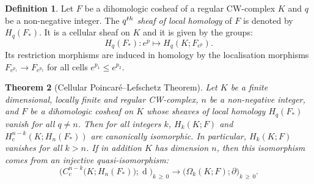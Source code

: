 \documentclass[10pt]{amsart}
\newtheorem{theo}{Theorem}[section]
\theoremstyle{definition}
\newtheorem{defi}[theo]{Definition}
\numberwithin{equation}{section}
\numberwithin{figure}{section}
\DeclareMathOperator{\df}{d}
\begin{document}
\begin{defi}\label{def:loc_hom_shea}
Let $F$ be a dihomologic cosheaf of a regular CW-complex $K$ and $q$ be a non-negative integer. The $q^{\rm th}$ \emph{sheaf of local homology} of $F$ is denoted by $H_q(F_*)$. It is a cellular sheaf on $K$ and it is given by the groups:
\begin{equation*}
H_q(F_*):e^p\mapsto H_q(K;F_{e^p}).
\end{equation*}
Its restriction morphisms are induced in homology by the localisation morphisms $F_{e^{p_1}}\rightarrow F_{e^{p_2}}$ for all cells $e^{p_1}\leq e^{p_2}$.
\end{defi}
\begin{theo}[Cellular Poincaré--Lefschetz Theorem]\label{thm:cell_poinca_lef}
Let $K$ be a finite dimensional, locally finite and regular CW-complex, $n$ be a non-negative integer, and $F$ be a dihomologic cosheaf on $K$ whose sheaves of local homology $H_q(F_*)$ vanish for all $q\neq n$. Then for all integers $k$, $H_k(K;F)$ and $H_c^{n-k}(K;H_n(F_*))$ are canonically isomorphic. In particular, $H_k(K;F)$ vanishes for all $k>n$. If in addition $K$ has dimension $n$, then this isomorphism comes from an injective quasi-isomorphism:
\begin{equation*}
\big(C^{n-k}_c\big(K;H_n(F_*)\big);\df\big)_{k\,\geq\,0}\rightarrow \big(\Omega_k(K;F);\partial\big)_{k\,\geq\,0}.
\end{equation*}
\end{theo}
\end{document}
